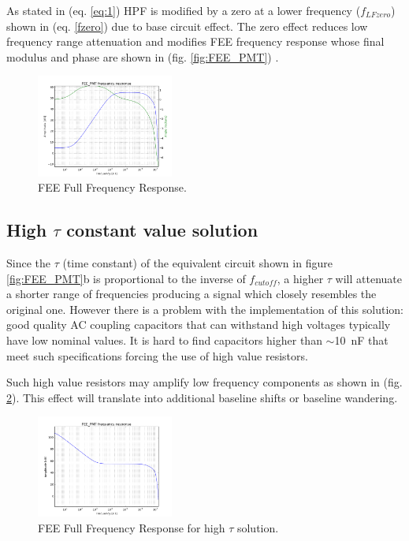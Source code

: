 \documentclass[a4paper, 10pt, oneside, twocolumn, 3p]{elsarticle}
\begin{document}
\par As stated in (eq. \ref{eq:1}) HPF is modified by a zero at a lower frequency  ($f_{LFzero}$) shown in (eq. \ref{fzero}) due to base circuit effect. The zero effect reduces low frequency range attenuation and modifies FEE frequency response whose final modulus and phase are shown in (fig. \ref{fig:FEE_PMT}) .


\begin{figure}
	\begin{center}
		\includegraphics[width=0.4\textwidth]{./figures/FEEfull_freq.png}
		\caption{FEE Full Frequency Response.}
		\label{fig:Full_Freq}
	\end{center}
\end{figure}


\subsection {High $\tau$ constant value solution}

Since the $\tau$ (time constant) of the equivalent circuit shown in figure \ref{fig:FEE_PMT}b is proportional to the inverse of $f_{cutoff}$, a higher $\tau$ will attenuate a shorter range of frequencies producing a signal which closely resembles the original one. However there is a problem with the implementation of this solution: good quality AC coupling capacitors that can withstand high voltages typically have low nominal values. It is hard to find capacitors higher than $\sim$10~nF that meet such specifications forcing the use of high value resistors. 

Such high value resistors may amplify low frequency components as shown in (fig. \ref{fig:Full_Freq_high_tau}). This effect will translate into additional baseline shifts or baseline wandering. 

\begin{figure}
	\begin{center}
		\includegraphics[width=0.4\textwidth]{./figures/tau_badidea.png}
		\caption{FEE Full Frequency Response for high $\tau$ solution.}
		\label{fig:Full_Freq_high_tau}
	\end{center}
\end{figure}
\end{document}
